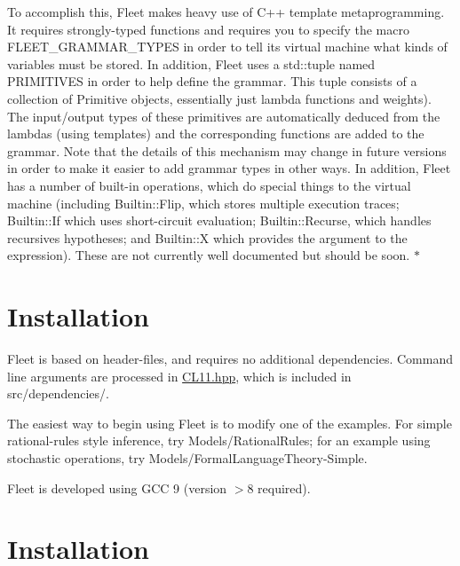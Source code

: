To accomplish this, Fleet makes heavy use of C++ template metaprogramming. It requires strongly-\/typed functions and requires you to specify the macro F\+L\+E\+E\+T\+\_\+\+G\+R\+A\+M\+M\+A\+R\+\_\+\+T\+Y\+P\+ES in order to tell its virtual machine what kinds of variables must be stored. In addition, Fleet uses a std\+::tuple named P\+R\+I\+M\+I\+T\+I\+V\+ES in order to help define the grammar. This tuple consists of a collection of Primitive objects, essentially just lambda functions and weights). The input/output types of these primitives are automatically deduced from the lambdas (using templates) and the corresponding functions are added to the grammar. Note that the details of this mechanism may change in future versions in order to make it easier to add grammar types in other ways. In addition, Fleet has a number of built-\/in operations, which do special things to the virtual machine (including Builtin\+::\+Flip, which stores multiple execution traces; Builtin\+::\+If which uses short-\/circuit evaluation; Builtin\+::\+Recurse, which handles recursives hypotheses; and Builtin\+::X which provides the argument to the expression). These are not currently well documented but should be soon. $\ast$\hypertarget{index_install_sec}{}\section{Installation}\label{index_install_sec}
Fleet is based on header-\/files, and requires no additional dependencies. Command line arguments are processed in \hyperlink{_c_l11_8hpp}{C\+L11.\+hpp}, which is included in src/dependencies/.

The easiest way to begin using Fleet is to modify one of the examples. For simple rational-\/rules style inference, try Models/\+Rational\+Rules; for an example using stochastic operations, try Models/\+Formal\+Language\+Theory-\/\+Simple.

Fleet is developed using G\+CC 9 (version $>$8 required).\hypertarget{index_install_sec}{}\section{Installation}\label{index_install_sec}

